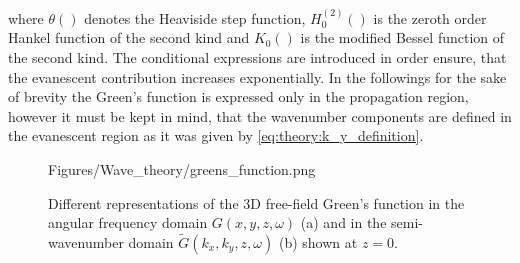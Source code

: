 \begin{center}
\end{center}
where $\theta\left( \right)$ denotes the Heaviside step function, $H_0^{(2)}\left( \right)$ is the zeroth order Hankel function of the second kind and $K_0\left( \right)$ is the modified Bessel function of the second kind.
The conditional expressions are introduced in order ensure, that the evanescent contribution increases exponentially. In the followings for the sake of brevity the Green's function is expressed only in the propagation region, however it must be kept in mind, that the wavenumber components are defined in the evanescent region as it was given by \eqref{eq:theory:k_y_definition}.
\begin{figure}
	\centering
	\begin{overpic}[width = .95\columnwidth]{Figures/Wave_theory/greens_function.png}
	\small
	\end{overpic}
	\caption{Different representations of the 3D free-field Green's function in the angular frequency domain $G(x,y,z,\omega)$ (a) and in the semi-wavenumber domain $\tilde{G}(k_x,k_y,z,\omega)$ (b) shown at $z=0$.}
	\label{Fig:Theory:Greens_function}
\end{figure}

